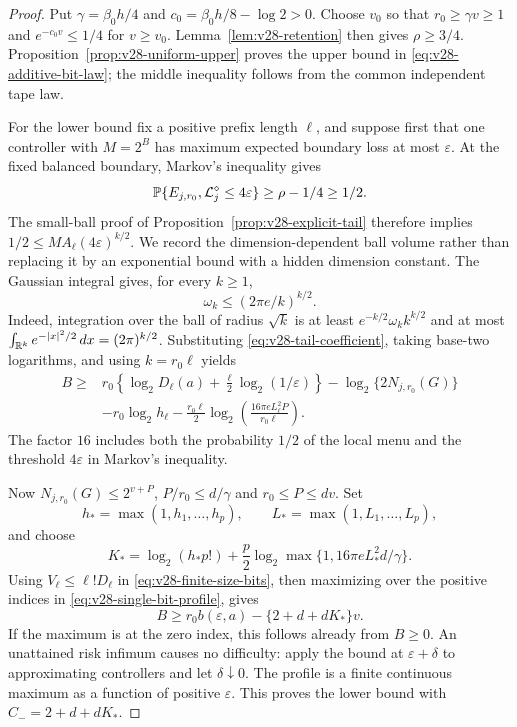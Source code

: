 \begin{proof}
Put $\gamma=\beta_0h/4$ and
$c_0=\beta_0h/8-\log 2>0$. Choose $v_0$ so that
$r_0\ge\gamma v\ge1$ and $e^{-c_0v}\le1/4$ for $v\ge v_0$.
Lemma~\ref{lem:v28-retention} then gives $\rho\ge3/4$.
Proposition~\ref{prop:v28-uniform-upper} proves the upper bound in
\eqref{eq:v28-additive-bit-law}; the middle inequality follows from
the common independent tape law.

For the lower bound fix a positive prefix length $\ell$, and suppose
first that one controller with $M=2^B$ has maximum expected boundary
loss at most $\varepsilon$. At the fixed balanced boundary, Markov's
inequality gives
\[
 \mathbb P\{E_{j,r_0},\mathcal L_j^\diamond\le4\varepsilon\}
                         \ge\rho-1/4\ge1/2.
\]
The small-ball proof of Proposition~\ref{prop:v28-explicit-tail}
therefore implies $1/2\le M A_\ell(4\varepsilon)^{k/2}$.
We record the dimension-dependent ball volume rather than replacing
it by an exponential bound with a hidden dimension constant. The
Gaussian integral gives, for every $k\ge1$,
\begin{equation}\label{eq:v28-ball-volume}
                         \omega_k\le(2\pi e/k)^{k/2}.
\end{equation}
Indeed, integration over the ball of radius $\sqrt k$ is at least
$e^{-k/2}\omega_k k^{k/2}$ and at most
$\int_{\mathbb R^k}e^{-|x|^2/2}\,dx=(2\pi)^{k/2}$.
Substituting \eqref{eq:v28-tail-coefficient}, taking base-two
logarithms, and using $k=r_0\ell$ yields
\begin{equation}\label{eq:v28-finite-size-bits}
 \begin{split}
 B\ge{}&r_0\left\{\log_2D_\ell(a)
                      +\frac\ell2\log_2(1/\varepsilon)\right\}
                  -\log_2\{2N_{j,r_0}(G)\}\\
       &-r_0\log_2h_\ell
         -\frac{r_0\ell}{2}
              \log_2\left(\frac{16\pi e L_\ell^2P}{r_0\ell}\right).
 \end{split}
\end{equation}
The factor $16$ includes both the probability $1/2$ of the local menu
and the threshold $4\varepsilon$ in Markov's inequality.

Now $N_{j,r_0}(G)\le2^{v+P}$, $P/r_0\le d/\gamma$ and
$r_0\le P\le dv$. Set
\[
 h_* =\max(1,h_1,\ldots,h_p),\qquad
 L_* =\max(1,L_1,\ldots,L_p),
\]
and choose
\[
 K_* =\log_2(h_*p!)+\frac p2
                 \log_2\max\{1,16\pi e L_*^2d/\gamma\}.
\]
Using $V_\ell\le\ell!D_\ell$ in
\eqref{eq:v28-finite-size-bits}, then maximizing over the positive
indices in \eqref{eq:v28-single-bit-profile}, gives
\[
             B\ge r_0b(\varepsilon,a)
                            -\{2+d+dK_*\}v.
\]
If the maximum is at the zero index, this follows already from
$B\ge0$. An unattained risk infimum causes no difficulty: apply the
bound at $\varepsilon+\delta$ to approximating controllers and let
$\delta\downarrow0$. The profile is a finite continuous maximum as
a function of positive $\varepsilon$. This proves the lower bound
with $C_-=2+d+dK_*$.


\end{proof}
